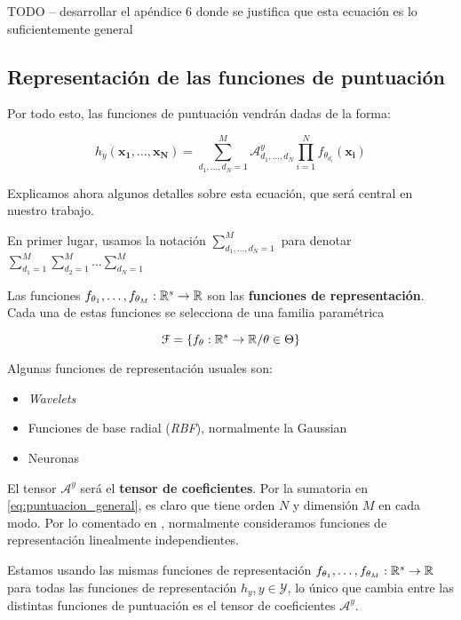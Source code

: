 TODO -- desarrollar el apéndice 6 donde se justifica que esta ecuación es lo suficientemente general

\subsection{Representación de las funciones de puntuación}

Por todo esto, las funciones de puntuación vendrán dadas de la forma:

\begin{equation} \label{eq:puntuacion_general}
    h_y(\mathbf{x_1}, \ldots, \mathbf{x_N}) = \sum_{d_1, \ldots, d_N = 1}^{M} \mathcal{A}^y_{d_1, \ldots, d_N} \prod_{i = 1}^N f_{\theta_{d_i}}(\mathbf{x_i})
\end{equation}

Explicamos ahora algunos detalles sobre esta ecuación, que será central en nuestro trabajo.

En primer lugar, usamos la notación $\sum_{d_1, \ldots, d_N = 1}^{M}$ para denotar $\sum_{d_1 = 1}^{M} \sum_{d_2 = 1}^{M} \ldots \sum_{d_N = 1}^{M}$

Las funciones $f_{\theta_1}, \ldots, f_{\theta_M}: \mathbb{R}^s \to \mathbb{R}$ son las \textbf{funciones de representación}. Cada una de estas funciones se selecciona de una familia paramétrica

$$\mathcal{F} = \{ f_{\theta}: \mathbb{R}^s \to \mathbb{R} / \theta \in \Theta \}$$

Algunas funciones de representación usuales son:

\begin{itemize}
    \item \textit{Wavelets}
    \item Funciones de base radial (\textit{RBF}), normalmente la Gaussian
    \item Neuronas
\end{itemize}

El tensor $\mathcal{A}^y$ será el \textbf{tensor de coeficientes}. Por la sumatoria en \eqref{eq:puntuacion_general}, es claro que tiene orden $N$ y dimensión $M$ en cada modo. Por lo comentado en , normalmente consideramos funciones de representación linealmente independientes.

Estamos usando las mismas funciones de representación $f_{\theta_1}, \ldots, f_{\theta_M}: \mathbb{R}^s \to \mathbb{R}$ para todas las funciones de representación $h_y, y \in \mathcal{Y}$, lo único que cambia entre las distintas funciones de puntuación es el tensor de coeficientes $\mathcal{A}^y$.

